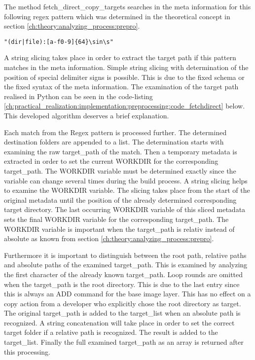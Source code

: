 The method fetch\_direct\_copy\_targets searches in the meta information for this following regex pattern which was determined in the theoretical concept in section \ref{ch:theory:analyzing_process:prepro}.
\begin{lstlisting}
"(dir|file):[a-f0-9]{64}\sin\s"
\end{lstlisting}
A string slicing takes place in order to extract the target path if this pattern matches in the meta information. 
Simple string slicing with determination of the position of special delimiter signs is possible. 
This is due to the fixed schema or the fixed syntax of the meta information.
The examination of the target path realised in Python can be seen in the code-listing \ref{ch:practical_realization:implementation:preprocessing:code_fetchdirect} below.
This developed algorithm deserves a brief explanation.

Each match from the Regex pattern is processed further. 
The determined destination folders are appended to a list. 
The determination starts with examining the raw target\_path of the match. 
Then a temporary metadata is extracted in order to set the current WORKDIR for the corresponding target\_path. 
The WORKDIR variable must be determined exactly since the variable can change several times during the build process. 
A string slicing helps to examine the WORKDIR variable. 
The slicing takes place from the start of the original metadata until the position of the already determined corresponding target directory. 
The last occurring WORKDIR variable of this sliced metadata sets the final WORKDIR variable for the corresponding target\_path. 
The WORKDIR variable is important when the target\_path is relativ instead of absolute as known from section \ref{ch:theory:analyzing_process:prepro}.

Furthermore it is important to distinguish between the root path, relative paths and absolute paths of the examined target\_path. 
This is examined by analyzing the first character of the already known target\_path. 
Loop rounds are omitted when the target\_path is the root directory. 
This is due to the last entry since this is always an ADD command for the base image layer. 
This has no effect on a copy action from a developer who explicitly chose the root directory as target.
The original target\_path is added to the target\_list when an absolute path is recognized. 
A string concatenation will take place in order to set the correct target folder if a relative path is recognized. The result is added to the target\_list.
Finally the full examined target\_path as an array is returned after this processing.

